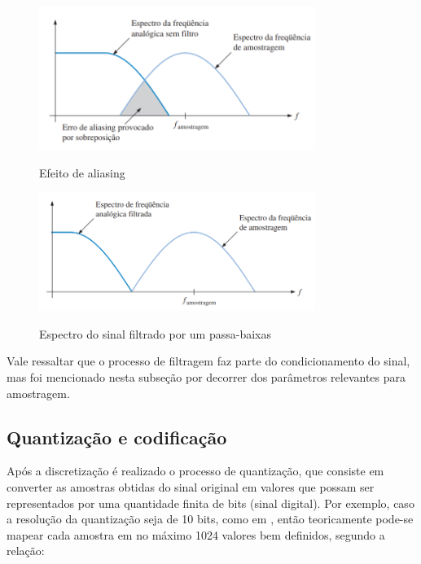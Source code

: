 \documentclass[oneside,openright,12pt]{ufsm_2015} %
\begin{document}
\begin{figure}[ht]
    \caption{\label{exepretex} Efeito de aliasing}
    \centering
    \includegraphics[width=0.8\textwidth]{figuras/aliasing.png}
    \vspace{\baselineskip} %
        \label{fig:efeito-aliasing}
\end{figure}

\begin{figure}[ht]
    \caption{\label{exepretex} Espectro do sinal filtrado por um passa-baixas}
    \centering
    \includegraphics[width=0.8\textwidth]{figuras/passa-baixas.png}
    \vspace{\baselineskip} %
        \label{fig:passa-baixas}
\end{figure}

Vale ressaltar que o processo de filtragem faz parte do condicionamento do sinal, mas foi mencionado nesta subseção por decorrer dos parâmetros relevantes para amostragem.

\subsection{Quantização e codificação}
Após a discretização é realizado o processo de quantização, que consiste em converter as amostras obtidas do sinal original em valores que possam ser representados por uma quantidade finita de bits (sinal digital). Por exemplo, caso a resolução da quantização seja de 10 bits, como em \cite{ATmega3218:online}, então teoricamente pode-se mapear cada amostra em no máximo 1024 valores bem definidos, segundo a relação:
\end{document}
